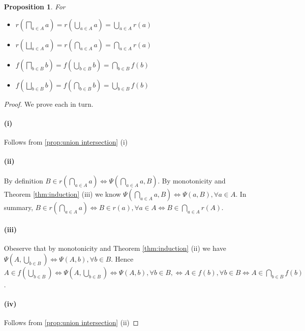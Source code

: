 \documentclass[12pt]{article}
\theoremstyle{definition}
\theoremstyle{plain}
\theoremstyle{plain}
\newtheorem{proposition}{Proposition}[section]
\theoremstyle{plain}
\theoremstyle{plain}
\theoremstyle{remark}
\theoremstyle{remark}
\begin{document}
\begin{proposition} For 
	\begin{itemize}
		\item[(i)] $r(\bigsqcap_{a \in A} a) = r(\bigcup_{a \in A} a) = \bigcup_{a \in A}r(a)$
		\item[(ii)] $r(\bigsqcup_{a \in A} a) = r(\bigcap_{a \in A} a) = \bigcap_{a \in A}r(a)$
		\item[(iii)] $f(\bigsqcap_{b \in B} b) = f(\bigcup_{b \in B} b) = \bigcap_{b \in B}f(b)$
		\item[(iv)] $f(\bigsqcup_{b \in B} b) = f(\bigcap_{b \in B} b) = \bigcup_{b \in B}f(b)$
	\end{itemize}
\end{proposition}
\begin{proof}We prove each in turn.
	
	\paragraph{(i)} Follows from \ref{prop:union intersection} (i)
	
	\paragraph{(ii)} By definition $B \in r(\bigcap_{a \in A} a) \Leftrightarrow \Psi(\bigcap_{a \in A} a, B)$. By monotonicity and Theorem \ref{thm:induction} (iii) we know $\Psi(\bigcap_{a \in A} a, B) \Leftrightarrow \Psi(a,B), \forall a \in A$. In summary, $B \in r(\bigcap_{a \in A} a) \Leftrightarrow B \in r(a), \forall a \in A \Leftrightarrow B \in \bigcap_{a \in A}r(A)$.
	
	\paragraph{(iii)} Obeserve that by monotonicity and Theorem \ref{thm:induction} (ii) we have $\Psi(A,\bigcup_{b \in B}) \Leftrightarrow \Psi(A,b), \forall b \in B$. Hence $A \in f(\bigcup_{b \in B}) \Leftrightarrow \Psi(A,\bigcup_{b \in B}) \Leftrightarrow \Psi(A,b), \forall b \in B, \Leftrightarrow A \in f(b), \forall b \in B \Leftrightarrow A \in \bigcap_{b \in B} f(b)$.
	
	\paragraph{(iv)} Follows from \ref{prop:union intersection} (ii)
\end{proof}
\end{document}
